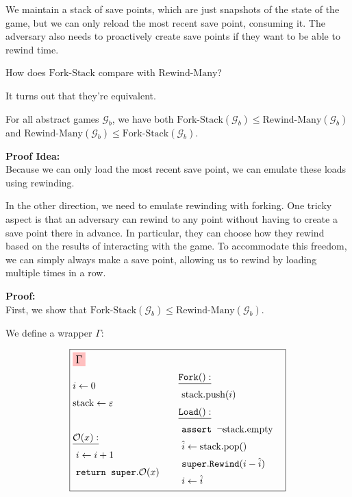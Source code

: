 We maintain a stack of save points, which are just snapshots of the state
of the game, but we can only reload the most recent save point, consuming
it.
The adversary also needs to proactively create save points if they want to be able
to rewind time.

How does $\text{Fork-Stack}$ compare with $\text{Rewind-Many}$?

It turns out that they're equivalent.

\begin{claim}
    \label{claim:fork-stack-is-not-stronger}
    For all abstract games $\mathcal{G}_b$, we have both
    $\text{Fork-Stack}(\mathcal{G}_b) \leq \text{Rewind-Many}(\mathcal{G}_b)$
    and $\text{Rewind-Many}(\mathcal{G}_b) \leq \text{Fork-Stack}(\mathcal{G}_b)$.
\end{claim}

\textbf{Proof Idea:}\\
Because we can only load the most recent save point, we can emulate
these loads using rewinding.

In the other direction, we need to emulate rewinding with forking.
One tricky aspect is that an adversary can rewind to any point without
having to create a save point there in advance.
In particular, they can choose how they rewind based on the results
of interacting with the game.
To accommodate this freedom, we can simply always make a save point,
allowing us to rewind by loading multiple times in a row.

\textbf{Proof:}\\
First, we show that $\text{Fork-Stack}(\mathcal{G}_b) \leq \text{Rewind-Many}(\mathcal{G}_b)$.

We define a wrapper $\Gamma$:

$$
\boxed{
\begin{aligned}
&\colorbox{pink}{\large $\Gamma$}\cr
&\begin{aligned}
    &i \gets 0\cr
    &\text{stack} \gets \varepsilon\cr
    &\cr
    &\underline{\mathcal{O}(x):}\cr
    &\ i \gets i + 1\cr
    &\ \texttt{return } \texttt{super}.\mathcal{O}(x)\cr
\end{aligned}
&\begin{aligned}
    &\underline{\texttt{Fork}():}\cr
    &\ \text{stack}.\text{push}(i)\cr
    &\underline{\texttt{Load}():}\cr
    &\ \texttt{assert } \neg \text{stack}.\text{empty}\cr
    &\ \hat{i} \gets \text{stack}.\text{pop}()\cr
    &\ \texttt{super}.\texttt{Rewind}(i - \hat{i})\cr
    &\ i \gets \hat{i}\cr
\end{aligned}\cr
\end{aligned}
}
$$

